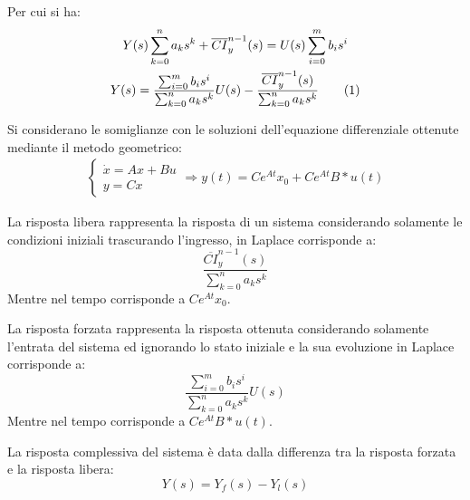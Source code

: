 \documentclass{article}
\numberwithin{equation}{subsection}
\newcommand{\tageq}{\tag{\stepcounter{equation}\theequation}}
\begin{document}
Per cui si ha:
\begin{gather*}
    Y(s)\displaystyle\sum_{k=0}^{n}a_ks^k+\overline{CI}_y^{n-1}(s)=U(s)\sum_{i=0}^{m}b_is^i\\
    Y(s)=\displaystyle\frac{\sum_{i=0}^{m}b_is^i}{\sum_{k=0}^{n}a_ks^k}U(s)-\frac{\overline{CI}_y^{n-1}(s)}{\sum_{k=0}^{n}a_ks^k}\tageq
\end{gather*}

Si considerano le somiglianze con le soluzioni dell'equazione differenziale ottenute mediante il metodo geometrico:
\begin{gather*}
    \begin{cases}
        \dot x=Ax+Bu\\
        y=Cx
    \end{cases}\Rightarrow
    y(t)=Ce^{At}x_0+Ce^{At}B*u(t)
\end{gather*}

La risposta libera rappresenta la risposta di un sistema considerando solamente le condizioni iniziali trascurando l'ingresso, in Laplace corrisponde a:
\begin{equation*} 
    \displaystyle\frac{\overline{CI}_y^{n-1}(s)}{\sum_{k=0}^{n}a_ks^k}
\end{equation*}    
Mentre nel tempo corrisponde a $Ce^{At}x_0$. 


La risposta forzata rappresenta la risposta ottenuta considerando solamente l'entrata del sistema ed ignorando lo stato iniziale e la sua evoluzione in Laplace corrisponde a: 
\begin{equation*}
    \displaystyle\frac{\sum_{i=0}^{m}b_is^i}{\sum_{k=0}^{n}a_ks^k}U(s)
\end{equation*}    
Mentre nel tempo corrisponde a $Ce^{At}B*u(t)$.

La risposta complessiva del sistema è data dalla differenza tra la risposta forzata e la risposta libera: 
\begin{equation*}
    Y(s)=Y_f(s)-Y_l(s)
\end{equation*}
\end{document}
